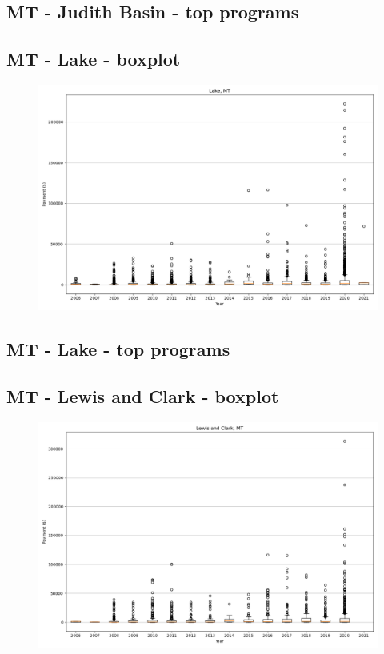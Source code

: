 \subsection*{MT - Judith Basin - top programs}

\newpage
\subsection*{MT - Lake - boxplot}
\begin{figure}[h]
\centering
\includegraphics[width=7in]{../output/boxplots/counties/Lake-MT_boxplot.png}
\end{figure}


\subsection*{MT - Lake - top programs}

\newpage
\subsection*{MT - Lewis and Clark - boxplot}
\begin{figure}[h]
\centering
\includegraphics[width=7in]{../output/boxplots/counties/Lewis and Clark-MT_boxplot.png}
\end{figure}


